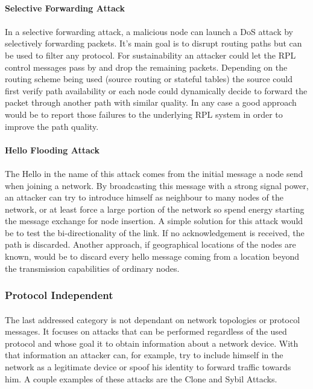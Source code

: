 \paragraph{\textbf{Selective Forwarding Attack}}
\paragraph{}
In a selective forwarding attack, a malicious node can launch a \ac{DoS} attack by selectively forwarding packets. It's main goal is to disrupt routing paths but can be used to filter any protocol. For sustainability an attacker could let the RPL control messages pass by and drop the remaining packets. Depending on the routing scheme being used (source routing or stateful tables) the source could first verify path availability or each node could dynamically decide to forward the packet through another path with similar quality. In any case a good approach would be to report those failures to the underlying RPL system in order to improve the path quality.

\paragraph{\textbf{Hello Flooding Attack}}
\paragraph{}
The Hello in the name of this attack comes from the initial message a node send when joining a network. By broadcasting this message with a strong signal power, an attacker can try to introduce himself as neighbour to many nodes of the network, or at least force a large portion of the network so spend energy starting the message exchange for node insertion. A simple solution for this attack would be to test the bi-directionality of the link. If no acknowledgement is received, the path is discarded. Another approach, if geographical locations of the nodes are known, would be to discard every hello message coming from a location beyond the transmission capabilities of ordinary nodes.

\subsubsection{Protocol Independent}
\paragraph{}
The last addressed category is not dependant on network topologies or protocol messages. It focuses on attacks that can be performed regardless of the used protocol and whose goal it to obtain information about a network device. With that information an attacker can, for example, try to include himself in the network as a legitimate device or spoof his identity to forward traffic towards him. A couple examples of these attacks are the Clone and Sybil Attacks.


